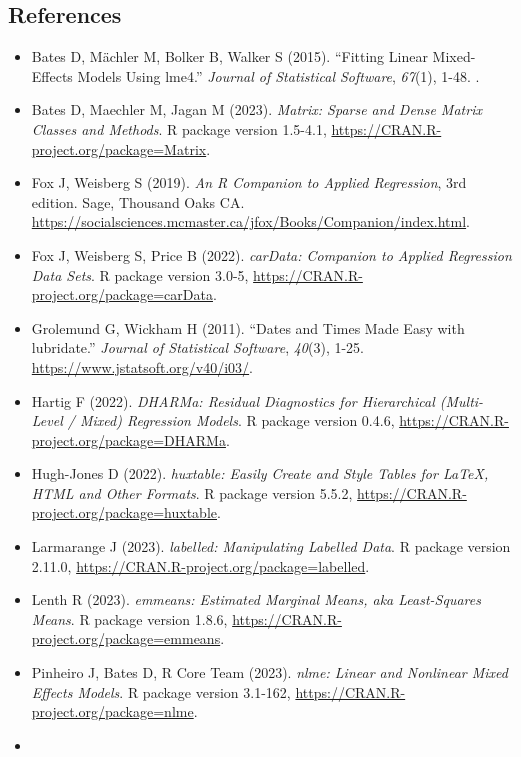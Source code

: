\documentclass[]{elsarticle} %
\providecommand{\tightlist}{%
  \setlength{\itemsep}{0pt}\setlength{\parskip}{0pt}}
\begin{document}
\hypertarget{references}{%
\subsection{References}\label{references}}

\begin{itemize}
\tightlist
\item
  Bates D, Mächler M, Bolker B, Walker S (2015). ``Fitting Linear
  Mixed-Effects Models Using lme4.'' \emph{Journal of Statistical
  Software}, \emph{67}(1), 1-48. .
\item
  Bates D, Maechler M, Jagan M (2023). \emph{Matrix: Sparse and Dense
  Matrix Classes and Methods}. R package version 1.5-4.1,
  \url{https://CRAN.R-project.org/package=Matrix}.
\item
  Fox J, Weisberg S (2019). \emph{An R Companion to Applied Regression},
  3rd edition. Sage, Thousand Oaks CA.
  \url{https://socialsciences.mcmaster.ca/jfox/Books/Companion/index.html}.
\item
  Fox J, Weisberg S, Price B (2022). \emph{carData: Companion to Applied
  Regression Data Sets}. R package version 3.0-5,
  \url{https://CRAN.R-project.org/package=carData}.
\item
  Grolemund G, Wickham H (2011). ``Dates and Times Made Easy with
  lubridate.'' \emph{Journal of Statistical Software}, \emph{40}(3),
  1-25. \url{https://www.jstatsoft.org/v40/i03/}.
\item
  Hartig F (2022). \emph{DHARMa: Residual Diagnostics for Hierarchical
  (Multi-Level / Mixed) Regression Models}. R package version 0.4.6,
  \url{https://CRAN.R-project.org/package=DHARMa}.
\item
  Hugh-Jones D (2022). \emph{huxtable: Easily Create and Style Tables
  for LaTeX, HTML and Other Formats}. R package version 5.5.2,
  \url{https://CRAN.R-project.org/package=huxtable}.
\item
  Larmarange J (2023). \emph{labelled: Manipulating Labelled Data}. R
  package version 2.11.0,
  \url{https://CRAN.R-project.org/package=labelled}.
\item
  Lenth R (2023). \emph{emmeans: Estimated Marginal Means, aka
  Least-Squares Means}. R package version 1.8.6,
  \url{https://CRAN.R-project.org/package=emmeans}.
\item
  Pinheiro J, Bates D, R Core Team (2023). \emph{nlme: Linear and
  Nonlinear Mixed Effects Models}. R package version 3.1-162,
  \url{https://CRAN.R-project.org/package=nlme}.
\item

\end{itemize}
\end{document}
